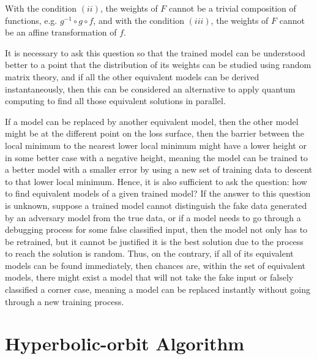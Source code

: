 \documentclass{article}
\theoremstyle{plain}
\theoremstyle{plain} %
\theoremstyle{definition}  %
\theoremstyle{remark}  %
\theoremstyle{plain}
\begin{document}
With the condition $(ii)$, the weights of $F$ cannot be a trivial composition of functions, e.g. $g^{-1}\circ g\circ f$, and with the condition $(iii)$, the weights of $F$ cannot be an affine transformation of $f$. 

It is necessary to ask this question so that the trained model can be understood better to a point that the distribution of its weights can be studied using random matrix theory, and if all the other equivalent models can be derived instantaneously, then this can be considered an alternative to apply quantum computing to find all those equivalent solutions in parallel.

If a model can be replaced by another equivalent model, then the other model might be at the different point on the loss surface, then the barrier between the local minimum to the nearest lower local minimum might have a lower height or in some better case with a negative height, meaning the model can be trained to a better model with a smaller error by using a new set of training data to descent to that lower local minimum. Hence, it is also sufficient to ask the question: how to find equivalent models of a given trained model? If the answer to this question is unknown, suppose a trained model cannot distinguish the fake data generated by an adversary model from the true data, or if a model needs to go through a debugging process for some false classified input, then the model not only has to be retrained, but it cannot be justified it is the best solution due to the process to reach the solution is random. Thus, on the contrary, if all of its equivalent models can be found immediately, then chances are, within the set of equivalent models, there might exist a model that will not take the fake input or falsely classified a corner case, meaning a model can be replaced instantly without going through a new training process.


\section{Hyperbolic-orbit Algorithm}

\end{document}
